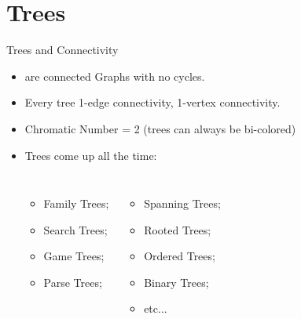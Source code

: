 \section{Trees}



\begin{frame}{Trees and Connectivity}

  {\larger
    \begin{itemize}
    \item {} are connected Graphs with \alert{no cycles}.
    \item Every tree 1-edge connectivity, 1-vertex connectivity.
    \item Chromatic Number = 2 (trees can always be bi-colored)

      \bigskip

    \item Trees come up all the time:
      \begin{columns}
        \begin{itemize}
        \item Family Trees;
        \item Search Trees;
        \item Game Trees;
        \item Parse Trees;
        \end{itemize}
        \begin{itemize}
        \item Spanning Trees;
        \item Rooted Trees;
        \item Ordered Trees;
        \item Binary Trees;
        \item etc...
        \end{itemize}
      \end{columns}
    \end{itemize}
  }
\end{frame}

